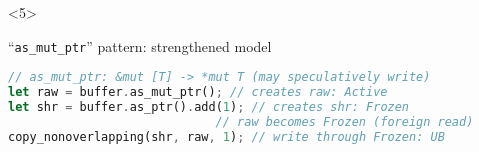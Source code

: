 \begin{frame}[fragile, t]
    \begin{onlyenv}<5>
        \begin{block}{{\xmark} ``\texttt{as\_mut\_ptr}'' pattern: strengthened model}
            \begin{lstlisting}[language=rust, basicstyle=\ttfamily\scriptsize]
// as_mut_ptr: &mut [T] -> *mut T (may speculatively write)
let raw = buffer.as_mut_ptr(); // creates raw: Active
let shr = buffer.as_ptr().add(1); // creates shr: Frozen
                             // raw becomes Frozen (foreign read)
copy_nonoverlapping(shr, raw, 1); // write through Frozen: UB
            \end{lstlisting}
        \end{block}
    \end{onlyenv}
\end{frame}

